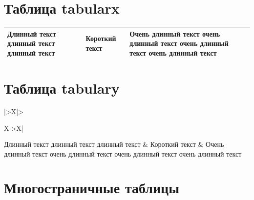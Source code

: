 \documentclass[a4paper,12pt]{article}
\begin{document}
\section{Таблица tabularx}

\noindent
\begin{tabularx}{\textwidth}{|X|X|X|}
\hline
Длинный текст длинный текст длинный текст &
Короткий текст &
Очень длинный текст очень длинный текст очень длинный текст очень длинный текст \\
\hline
\end{tabularx}

\section{Таблица tabulary}

\noindent
\begin{tabulary}{\textwidth}{|>{\centering\arraybackslash}X|>{\raggedright\arraybackslash}X|>{\raggedleft\arraybackslash}X|}
\hline
Длинный текст длинный текст длинный текст &
Короткий текст &
Очень длинный текст очень длинный текст очень длинный текст очень длинный текст \\
\hline
\end{tabulary}

\section{Многостраничные таблицы}
\end{document}
